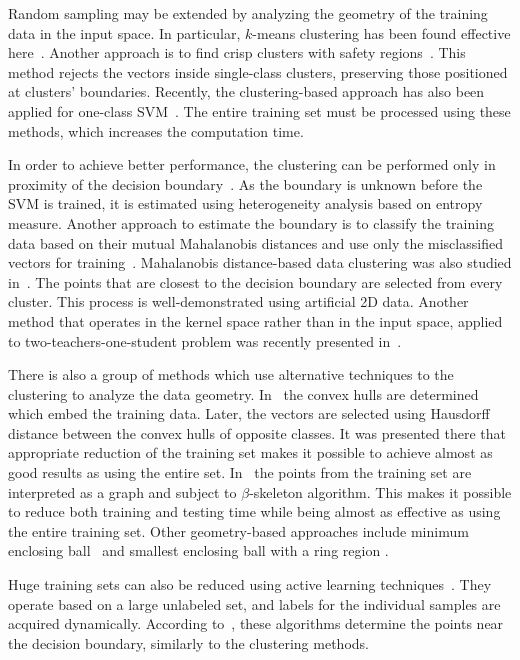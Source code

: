 \documentclass{llncs}
\begin{document}
Random sampling may be extended by analyzing the geometry of the
training data in the input space. In particular, $k$-means
clustering
has been found effective here~\cite{%
Chien2010}. Another approach is to find crisp clusters with safety
regions~\cite{Koggalage2004}. This method rejects the vectors inside
single-class clusters, preserving those positioned at clusters'
boundaries. Recently, the clustering-based approach has also been
applied for one-class SVM~\cite{YuhuaLi2011}. The entire training set must be processed using these
methods, which increases the computation time.

In order to achieve better performance, the clustering can be
performed only in proximity of the decision
boundary~\cite{Shin2007}. As the boundary is unknown before the SVM
is trained, it is estimated using heterogeneity analysis based on
entropy measure. Another approach to estimate the boundary is to
classify the training data based on their mutual Mahalanobis
distances and use only the misclassified vectors for
training~\cite{Abe2001}. Mahalanobis distance-based data clustering
was also studied in~\cite{DWang2008}. %
The
points that are closest to the decision boundary are selected from every cluster. This
process is well-demonstrated %
using artificial 2D
data. Another method that operates in the kernel space rather than
in the input space, applied to two-teachers-one-student problem was
recently presented in~\cite{Chang2012}.

There is also a group of methods which use alternative techniques to the
clustering to analyze the data geometry. In~\cite{JWang2005}
the convex hulls are determined which embed the training data. Later, the
vectors are selected using Hausdorff distance between the convex
hulls of opposite classes. It was presented there that appropriate reduction of the training set makes it possible to achieve almost as good results as using the entire set. In~\cite{Zhang2002} the points from the training set are interpreted as a graph and subject to $\beta$-skeleton algorithm. This makes it possible to reduce both training and testing time while being almost as effective as using the entire training set. Other geometry-based approaches include minimum enclosing ball~\cite{Tsang2005} and smallest enclosing ball with a ring region \cite{Zeng2008}.

Huge training sets can also be reduced using active
learning techniques~\cite{Schohn2000, Musicant2004}.%
 They operate based on a large unlabeled set, and labels for the
individual samples are acquired dynamically. According
to~\cite{Schohn2000}, these algorithms determine the points near the
decision boundary, similarly to the clustering methods.
\end{document}
